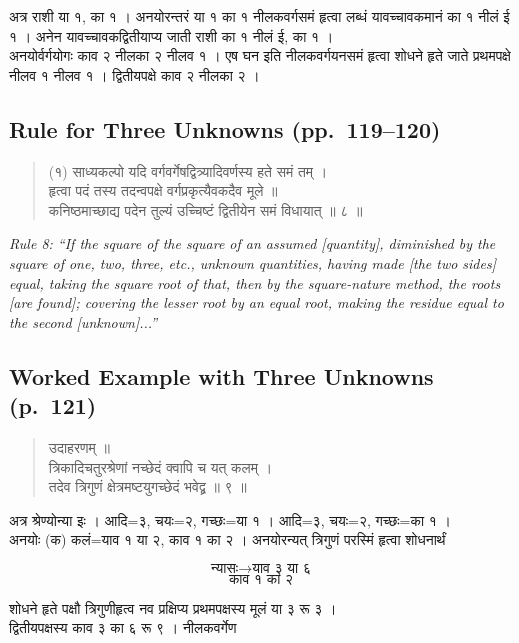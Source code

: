 \documentclass[11pt,a4paper]{article}
\newcommand{\cnote}[1]{\textcolor{notecolor}{\textit{#1}}}
\newcommand{\dev}[1]{{\devanagarifont #1}}
\newenvironment{sanskritverse}{%
  \begin{quote}
}{%
  \end{quote}
}
\begin{document}
\dev{%
अत्र राशी या १, का १ । अनयोरन्तरं या १ का १ नीलकवर्गसमं हृत्वा लब्धं यावच्चावकमानं का १ नीलं ई १ । अनेन यावच्चावकद्वितीयाप्य जाती राशी का १ नीलं ई, का १ ।\\
अनयोर्वर्गयोगः काव २ नीलका २ नीलव १ । एष घन इति नीलकवर्गयनसमं हृत्वा शोधने हृते जाते प्रथमपक्षे नीलव १ नीलव १ । द्वितीयपक्षे काव २ नीलका २ ।}

\subsection*{Rule for Three Unknowns (pp.\ 119--120)}

\begin{sanskritverse}
\dev{%
(१) साध्यकल्पो यदि वर्गवर्गेषद्वित्र्यादिवर्णस्य हते समं तम् ।\\
हृत्वा पदं तस्य तदन्वपक्षे वर्गप्रकृत्यैवकदैव मूले ॥\\
कनिष्ठमाच्छाद्य पदेन तुल्यं उच्चिष्टं द्वितीयेन समं विधायात् ॥ ८ ॥}
\end{sanskritverse}

\cnote{Rule 8: ``If the square of the square of an assumed [quantity], diminished by the square of one, two, three, etc., unknown quantities, having made [the two sides] equal, taking the square root of that, then by the square-nature method, the roots [are found]; covering the lesser root by an equal root, making the residue equal to the second [unknown]...''}

\subsection*{Worked Example with Three Unknowns (p.\ 121)}

\begin{sanskritverse}
\dev{%
उदाहरणम् ॥\\[0.3em]
त्रिकादिचतुरश्रेणां नच्छेदं क्वापि च यत् कलम् ।\\
तदेव त्रिगुणं क्षेत्रमष्टयुगच्छेदं भवेद्व्र ॥ ९ ॥}
\end{sanskritverse}

\dev{%
अत्र श्रेण्योन्या इः । आदि=३, चयः=२, गच्छः=या १ । आदि=३, चयः=२, गच्छः=का १ ।\\
अनयोः (क) कलं=याव १ या २, काव १ का २ । अनयोरन्यत् त्रिगुणं परस्मिं हृत्वा शोधनार्थं}

$$\text{न्यासः} \longrightarrow \text{याव ३ या ६}$$
$$\text{काव १ का २}$$

\dev{%
शोधने हृते पक्षौ त्रिगुणीहृत्व नव प्रक्षिप्य प्रथमपक्षस्य मूलं या ३ रू ३ ।\\
द्वितीयपक्षस्य काव ३ का ६ रू ९ । नीलकवर्गेण}
\end{document}
